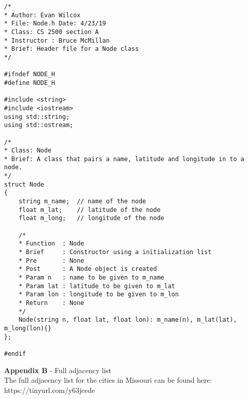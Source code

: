 \documentclass[a4paper]{article}
\begin{document}
    \begin{verbatim}
/*
* Author: Evan Wilcox
* File: Node.h Date: 4/23/19
* Class: CS 2500 section A
* Instructor : Bruce McMillan
* Brief: Header file for a Node class
*/

#ifndef NODE_H
#define NODE_H

#include <string>
#include <iostream>
using std::string;
using std::ostream;

/*
* Class: Node
* Brief: A class that pairs a name, latitude and longitude in to a node.
*/
struct Node
{
    string m_name;  // name of the node
    float m_lat;    // latitude of the node
    float m_long;   // longitude of the node

    /*
    * Function  : Node
    * Brief     : Constructor using a initialization list
    * Pre       : None
    * Post      : A Node object is created
    * Param n   : name to be given to m_name
    * Param lat : latitude to be given to m_lat
    * Param lon : longitude to be given to m_lon
    * Return    : None
    */
    Node(string n, float lat, float lon): m_name(n), m_lat(lat), m_long(lon){}
};

#endif
    \end{verbatim}


    \newpage
    \textbf{Appendix B} - Full adjacency list \\

    The full adjacency list for the cities in Missouri can be found here: \\
    https://tinyurl.com/y63jcede
\end{document}
